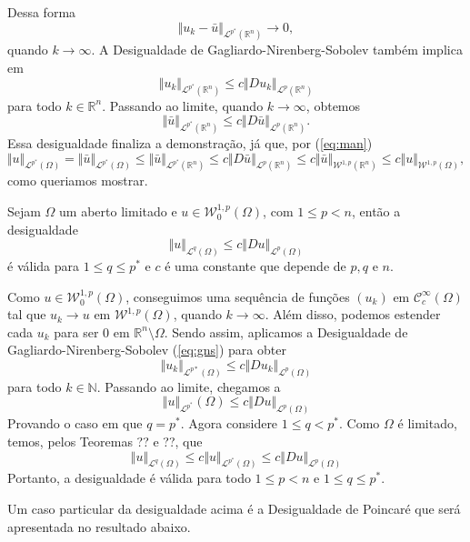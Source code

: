\documentclass[a4paper, 11pt]{book}
\theoremstyle{definition}
\newcommand{\bN}{\mathbb{N}}
\newcommand{\bR}{\mathbb{R}}
\newcommand{\cC}{\mathcal{C}}
\newcommand{\cL}{\mathcal{L}}
\newcommand{\cW}{\mathcal{W}}
\begin{document}
\begin{prf}
    Dessa forma
    \[
        \Vert u_k - \bar u \Vert_{\cL^{p^*}(\bR^n)} \to 0,
    \]
    quando $k \to \infty$.
    A Desigualdade de Gagliardo-Nirenberg-Sobolev também implica em
    \[  
        \Vert u_k \Vert_{\cL^{p^*}(\bR^n)} \leqslant c \Vert Du_k \Vert_{\cL^p(\bR^n)}
    \]
    para todo $k \in \bR^n$.
    Passando ao limite, quando $k \to \infty$, obtemos
    \[
        \Vert \bar u \Vert_{\cL^{p^*}(\bR^n)} \leqslant c \Vert D \bar u \Vert_{\cL^p(\bR^n)}.
    \]
    Essa desigualdade finaliza a demonstração, já que, por (\ref{eq:man})
    \[
        \Vert u \Vert_{\cL^{p^*}(\Omega)} = \Vert \bar u \Vert_{\cL^{p^*}(\Omega)} \leqslant \Vert \bar u \Vert_{\cL^{p^*}(\bR^n)} \leqslant c \Vert D \bar u \Vert_{\cL^p(\bR^n)} \leqslant c \Vert \bar u \Vert_{\cW^{1,p}(\bR^n)} \leqslant c \Vert u \Vert_{\cW^{1,p}(\Omega)},
    \]
    como queriamos mostrar.
\end{prf}

\begin{tbox}
    Sejam $\Omega$ um aberto limitado e $u \in \cW^{1,p}_0(\Omega)$, com $1 \leqslant p < n$, então a desigualdade
    \[
        \Vert u \Vert_{\cL^q(\Omega)} \leqslant c \Vert Du \Vert_{\cL^p(\Omega)}
    \]
    é válida para $1 \leqslant q \leqslant p^*$ e $c$ é uma constante que depende de $p, q$ e $n$.
\end{tbox}
\begin{prf}
    Como $u \in \cW^{1,p}_0(\Omega)$, conseguimos uma sequência de funções $(u_k)$ em $\cC^{\infty}_c(\Omega)$ tal que $u_k \to u$ em $\cW^{1,p}(\Omega)$, quando $k \to \infty$.
    Além disso, podemos estender cada $u_k$ para ser $0$ em $\bR^n \setminus \Omega$.
    Sendo assim, aplicamos a Desigualdade de Gagliardo-Nirenberg-Sobolev (\ref{eq:gns}) para obter
    \[
        \Vert u_k \Vert_{\cL^{p*}(\Omega)} \leqslant c \Vert Du_k \Vert_{\cL^p(\Omega)}
    \]
    para todo $k \in \bN$.
    Passando ao limite, chegamos a
    \[
        \Vert u \Vert_{\cL^{p^*}}(\Omega) \leqslant c \Vert Du \Vert_{\cL^p(\Omega)}
    \]
    Provando o caso em que $q = p^*$. Agora considere $1 \leqslant q < p^*$.
    Como $\Omega$ é limitado, temos, pelos Teoremas ?? e ??, que
    \[
        \Vert u \Vert_{\cL^q(\Omega)} \leqslant c\Vert u \Vert_{\cL^{p^*}(\Omega)} \leqslant c \Vert Du \Vert_{\cL^p(\Omega)}
    \]
    Portanto, a desigualdade é válida para todo $1 \leqslant p < n$ e $1 \leqslant q \leqslant p^*$.
\end{prf}

Um caso particular da desigualdade acima é a Desigualdade de Poincaré que será apresentada no resultado abaixo.
\end{document}
